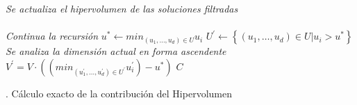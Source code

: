 \begin{algorithm}
\begin{algorithmic}[1]
{			}\DIFaddend \ELSE 
				\STATE \textit{Se actualiza el hipervolumen de las soluciones filtradas}\\
				\DIFdelbegin {}\DIFdelend \DIFaddbegin {}\DIFaddend \ENDIF
		\ENDFOR
	\ELSE {} 
		\STATE \DIFdelbegin {}\DIFdelend \DIFaddbegin {}\DIFaddend \STATE \DIFdelbegin {}\DIFdelend \DIFaddbegin {}\DIFaddend \\
		\textit{Continua la recursi\'on}   
			\STATE $u^{*} \leftarrow min_{\left(u_1,\ldots,u_d\right)\in U} u_i$ 
			\STATE $U^{'}\leftarrow \left\{\left(u_1,\ldots,u_d\right)\in U | u_i > u^{*} \right\}$\\
			\textit{Se analiza la dimensi\'on actual en forma ascendente}
				\STATE $V^{'} = V \cdot \left( \left(min_{\left(u^{'}_1,\ldots,u^{'}_d\right)\in U^{'}} u^{'}_i\right)-u^{*}\right) $
				\STATE \DIFdelbegin {}\DIFdelend \DIFaddbegin {}\DIFaddend \ENDIF 
			\STATE \DIFdelbegin {}\DIFdelend \DIFaddbegin {}\DIFaddend \ENDWHILE
		\ENDIF
	\ENDIF		
	\STATE \DIFdelbegin {}\DIFdelend \DIFaddbegin {}\DIFaddend \RETURN  $C$
  \end{algorithmic}
\caption[$hypeExact$]{\DIFdelbegin {}\DIFdelend \DIFaddbegin {}\DIFaddend . C\'alculo exacto de la contribuci\'on del Hipervolumen}
\label{alg:hvexac}
\end{algorithm}

